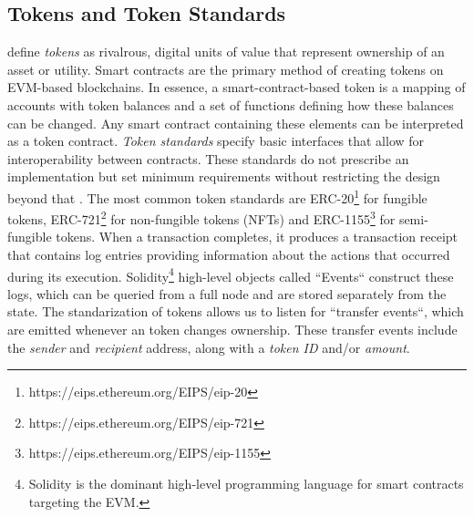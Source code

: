 \documentclass[12pt,a4paper,titlepage,oneside,english]{article}
\begin{document}
\subsection{Tokens and Token Standards}
\cite{roth2019tokenization} define \textit{tokens} as rivalrous, digital units of value that represent ownership of an asset or utility. Smart contracts are the primary method of creating tokens on EVM-based blockchains. In essence, a smart-contract-based token is a mapping of accounts with token balances and a set of functions defining how these balances can be changed. Any smart contract containing these elements can be interpreted as a token contract. \citep{roth2019tokenization} \newline
\textit{Token standards} specify basic interfaces that allow for interoperability between contracts. These standards do not prescribe an implementation but set minimum requirements without restricting the design beyond that \citep{mastering_ethereum}. 
The most common token standards are ERC-20\footnote{https://eips.ethereum.org/EIPS/eip-20} for fungible tokens, ERC-721\footnote{https://eips.ethereum.org/EIPS/eip-721} for non-fungible tokens (NFTs) and ERC-1155\footnote{https://eips.ethereum.org/EIPS/eip-1155} for semi-fungible tokens.\newline
When a transaction completes, it produces a transaction receipt  that contains log entries providing information about the actions that occurred during its execution. Solidity\footnote{Solidity is the dominant high-level programming language for smart contracts targeting the EVM.} high-level objects called ``Events`` construct these logs, which can be queried from a full node and are stored separately from the state. \citep{mastering_ethereum} \newline
The standarization of tokens allows us to listen for ``transfer events``, which are emitted whenever an token changes ownership.
These transfer events include the \textit{sender} and \textit{recipient} address, along with a \textit{token ID} and/or \textit{amount}. 

\end{document}
